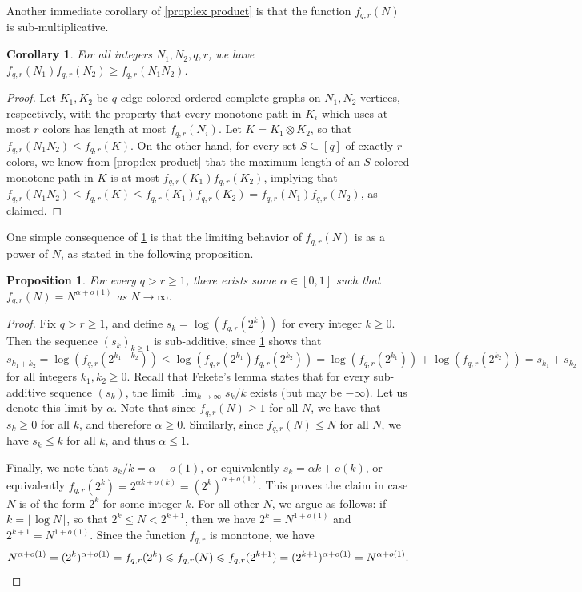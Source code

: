 \documentclass[11pt,reqno]{amsart}
\newtheorem{proposition}[theorem]{Proposition}
\newtheorem{corollary}[theorem]{Corollary}
\theoremstyle{definition}
\newcommand{\flo}[1]{\lfloor #1 \rfloor}
\newcommand\1{\mathbf{1}}
\let\leq\leqslant
\let\geq\geqslant
\begin{document}
Another immediate corollary of \cref{prop:lex product} is that the function $f_{q,r}(N)$ is sub-multiplicative. 
\begin{corollary}\label{cor:submultiplicative}
    For all integers $N_1,N_2, q,r$, we have $f_{q,r}(N_1)f_{q,r}(N_2) \geq f_{q,r}(N_1N_2)$.
\end{corollary}
\begin{proof}
    Let $K_1,K_2$ be $q$-edge-colored ordered complete graphs on $N_1,N_2$ vertices, respectively, with the property that every monotone path in $K_i$ which uses at most $r$ colors has length at most $f_{q,r}(N_i)$. Let $K = K_1 \otimes K_2$, so that $f_{q,r}(N_1 N_2) \leq f_{q,r}(K)$. On the other hand, for every set $S \subseteq [q]$ of exactly $r$ colors, we know from \cref{prop:lex product} that the maximum length of an $S$-colored monotone path in $K$ is at most $f_{q,r}(K_1)f_{q,r}(K_2)$, implying that $f_{q,r}(N_1 N_2)\leq f_{q,r}(K) \leq f_{q,r}(K_1)f_{q,r}(K_2) = f_{q,r}(N_1)f_{q,r}(N_2)$, as claimed. 
\end{proof}
One simple consequence of \cref{cor:submultiplicative} is that the limiting behavior of $f_{q,r}(N)$ is as a power of $N$, as stated in the following proposition.
\begin{proposition}
    For every $q >r \geq 1$, there exists some $\alpha \in [0,1]$ such that $f_{q,r}(N)=N^{\alpha+o(1)}$ as $N \to \infty$.
\end{proposition}
\begin{proof}
    Fix $q >r\geq 1$, and define $s_k = \log (f_{q,r}(2^k))$ for every integer $k \geq 0$.
    Then the sequence $(s_k)_{k\geq 1}$ is sub-additive, since \cref{cor:submultiplicative} shows that
    \[
    s_{k_1+k_2} = \log (f_{q,r}(2^{k_1+k_2})) \leq \log (f_{q,r}(2^{k_1}) f_{q,r} (2^{k_2})) = \log (f_{q,r}(2^{k_1}))+ \log (f_{q,r}(2^{k_2})) = s_{k_1}+s_{k_2}
    \]
    for all integers $k_1,k_2\geq 0$. Recall that Fekete's lemma states that for every sub-additive sequence $(s_k)$, the limit $\lim_{k \to \infty} s_k/k$ exists (but may be $-\infty$). Let us denote this limit by $\alpha$. Note that since $f_{q,r}(N)\geq 1$ for all $N$, we have that $s_k \geq 0$ for all $k$, and therefore $\alpha\geq 0$. Similarly, since $f_{q,r}(N)\leq N$ for all $N$, we have $s_k \leq k$ for all $k$, and thus $\alpha \leq 1$.

    Finally, we note that $s_k/k=\alpha+o(1)$, or equivalently $s_k =\alpha k +o(k)$, or equivalently $f_{q,r}(2^k) = 2^{\alpha k + o(k)}=(2^k)^{\alpha+o(1)}$. This proves the claim in case $N$ is of the form $2^k$ for some integer $k$. For all other $N$, we argue as follows: if $k = \flo{\log N}$, so that $2^k \leq N < 2^{k+1}$, then we have $2^k = N^{1+o(1)}$ and $2^{k+1}=N^{1+o(1)}$. Since the function $f_{q,r}$ is monotone, we have
    \[
    N^{\alpha+o(1)} = (2^k)^{\alpha+o(1)} = f_{q,r}(2^k) \leq f_{q,r}(N) \leq f_{q,r}(2^{k+1}) = (2^{k+1})^{\alpha+o(1)} = N^{\alpha+o(1)}.\qedhere
    \]
\end{proof}
\end{document}
